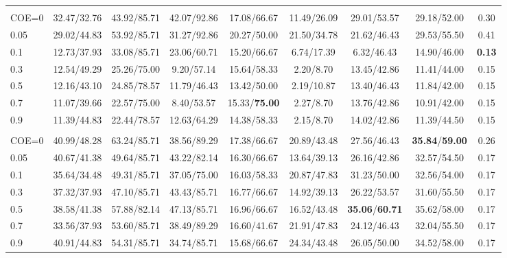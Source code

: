 \begin{table}[t]
{\begin{tabular}{@{}lcccccccc@{}}
\rowcolor{gray!15}
\multicolumn{9}{@{}l@{}}{\textbf{\textbf{BudgetMem-\textsc{Imp}} (COE)}} \\
COE=0   & 32.47/32.76 & 43.92/85.71 & 42.07/92.86 & 17.08/66.67 & 11.49/26.09 & 29.01/53.57 & 29.18/52.00 & 0.30 \\
0.05    & 29.02/44.83 & 53.92/85.71 & 31.27/92.86 & 20.27/50.00 & 21.50/34.78 & 21.62/46.43 & 29.53/55.50 & 0.41 \\
0.1     & 12.73/37.93 & 33.08/85.71 & 23.06/60.71 & 15.20/66.67 & 6.74/17.39  & 6.32/46.43  & 14.90/46.00 & \textbf{0.13} \\
0.3     & 12.54/49.29 & 25.26/75.00 & 9.20/57.14  & 15.64/58.33 & 2.20/8.70   & 13.45/42.86 & 11.41/44.00 & 0.15 \\
0.5     & 12.16/43.10 & 24.85/78.57 & 11.79/46.43 & 13.42/50.00 & 2.19/10.87  & 13.40/46.43 & 11.84/42.00 & 0.15 \\
0.7     & 11.07/39.66 & 22.57/75.00 & 8.40/53.57  & 15.33/\textbf{75.00} & 2.27/8.70   & 13.76/42.86 & 10.91/42.00 & 0.15 \\
0.9     & 11.39/44.83 & 22.44/78.57 & 12.63/64.29 & 14.38/58.33 & 2.15/8.70   & 14.02/42.86 & 11.39/44.50 & 0.15 \\
\midrule

\rowcolor{gray!15}
\multicolumn{9}{@{}l@{}}{\textbf{\textbf{BudgetMem-\textsc{Rea}} (COE)}} \\
COE=0   & 40.99/48.28 & 63.24/85.71 & 38.56/89.29 & 17.38/66.67 & 20.89/43.48 & 27.56/46.43 & \textbf{35.84}/\textbf{59.00} & 0.26 \\
0.05    & 40.67/41.38 & 49.64/85.71 & 43.22/82.14 & 16.30/66.67 & 13.64/39.13 & 26.16/42.86 & 32.57/54.50 & 0.17 \\
0.1     & 35.64/34.48 & 49.31/85.71 & 37.05/75.00 & 16.03/58.33 & 20.87/47.83 & 31.23/50.00 & 32.56/54.00 & 0.17 \\
0.3     & 37.32/37.93 & 47.10/85.71 & 43.43/85.71 & 16.77/66.67 & 14.92/39.13 & 26.22/53.57 & 31.60/55.50 & 0.17 \\
0.5     & 38.58/41.38 & 57.88/82.14 & 47.13/85.71 & 16.96/66.67 & 16.52/43.48 & \textbf{35.06}/\textbf{60.71} & 35.62/58.00 & 0.17 \\
0.7     & 33.56/37.93 & 53.60/85.71 & 38.49/89.29 & 16.60/41.67 & 21.91/47.83 & 24.12/46.43 & 32.04/55.50 & 0.17 \\
0.9     & 40.91/44.83 & 54.31/85.71 & 34.74/85.71 & 15.68/66.67 & 24.34/43.48 & 26.05/50.00 & 34.52/58.00 & 0.17 \\
\midrule


\end{tabular}}
\end{table}
